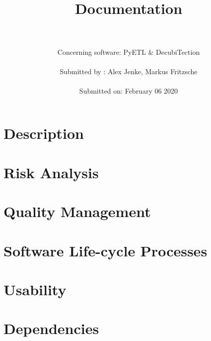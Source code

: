 \documentclass{article}
\title{\vspace{1.5cm}\\Documentation}
\author{\\
        \\
        Concerning software: \hspace{0.5cm} PyETL \&  DecubiTection \hspace{0.7cm} \\
        \\
        Submitted by : \hspace{1.5cm} Alex Jenke, Markus Fritzsche \\
        \\
        Submitted on: \hspace{1.65cm} February 06 2020 \hspace{2.05cm} \vspace{1.5cm}}
\date{}
\begin{document}
\maketitle
\thispagestyle{fancy}
\setcounter{tocdepth}{2}
\tableofcontents
\newpage

\section{Description}


\section{Risk Analysis}


\section{Quality Management} 


\section{Software Life-cycle Processes}


\section{Usability}


\section{Dependencies}

\end{document}
